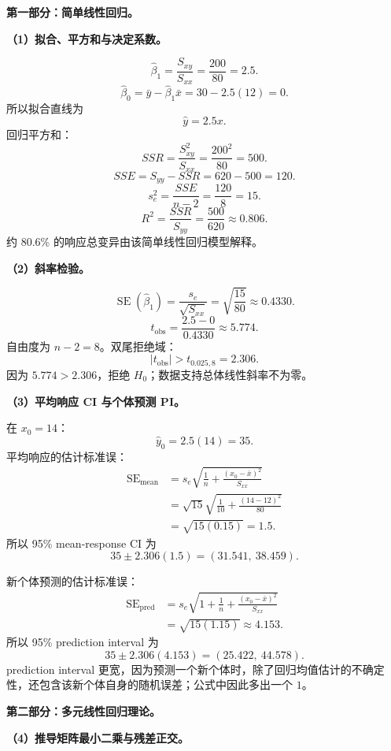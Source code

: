 \documentclass[11pt,a4paper]{article}
\newcommand{\SE}{\operatorname{SE}}
\begin{document}
\begin{solutionbox}
\textbf{第一部分：简单线性回归。}

\textbf{（1）拟合、平方和与决定系数。}

\[
  \hat\beta_1
  =
  \frac{S_{xy}}{S_{xx}}
  =
  \frac{200}{80}
  =
  2.5.
\]
\[
  \hat\beta_0
  =
  \bar y-\hat\beta_1\bar x
  =
  30-2.5(12)
  =
  0.
\]
所以拟合直线为
\[
  \boxed{\hat y=2.5x}.
\]
回归平方和：
\[
  SSR
  =
  \frac{S_{xy}^2}{S_{xx}}
  =
  \frac{200^2}{80}
  =
  500.
\]
\[
  SSE
  =
  S_{yy}-SSR
  =
  620-500
  =
  \boxed{120}.
\]
\[
  s_e^2
  =
  \frac{SSE}{n-2}
  =
  \frac{120}{8}
  =
  \boxed{15}.
\]
\[
  R^2
  =
  \frac{SSR}{S_{yy}}
  =
  \frac{500}{620}
  \approx
  \boxed{0.806}.
\]
约 80.6\% 的响应总变异由该简单线性回归模型解释。

\textbf{（2）斜率检验。}

\[
  \SE(\hat\beta_1)
  =
  \frac{s_e}{\sqrt{S_{xx}}}
  =
  \sqrt{\frac{15}{80}}
  \approx0.4330.
\]
\[
  t_{\mathrm{obs}}
  =
  \frac{2.5-0}{0.4330}
  \approx5.774.
\]
自由度为 $n-2=8$。双尾拒绝域：
\[
  |t_{\mathrm{obs}}|>t_{0.025,8}=2.306.
\]
因为 $5.774>2.306$，拒绝 $H_0$；数据支持总体线性斜率不为零。

\textbf{（3）平均响应 CI 与个体预测 PI。}

在 $x_0=14$：
\[
  \hat y_0
  =
  2.5(14)
  =
  35.
\]
平均响应的估计标准误：
\[
\begin{aligned}
  \SE_{\mathrm{mean}}
  &=
  s_e\sqrt{\frac1n+\frac{(x_0-\bar x)^2}{S_{xx}}}\\
  &=
  \sqrt{15}
  \sqrt{\frac1{10}+\frac{(14-12)^2}{80}}\\
  &=
  \sqrt{15(0.15)}
  =
  1.5.
\end{aligned}
\]
所以 95\% mean-response CI 为
\[
  35\pm2.306(1.5)
  =
  \boxed{(31.541,\ 38.459)}.
\]

新个体预测的估计标准误：
\[
\begin{aligned}
  \SE_{\mathrm{pred}}
  &=
  s_e\sqrt{
    1+\frac1n+\frac{(x_0-\bar x)^2}{S_{xx}}
  }\\
  &=
  \sqrt{15(1.15)}
  \approx4.153.
\end{aligned}
\]
所以 95\% prediction interval 为
\[
  35\pm2.306(4.153)
  =
  \boxed{(25.422,\ 44.578)}.
\]
prediction interval 更宽，因为预测一个新个体时，除了回归均值估计的不确定性，还包含该新个体自身的随机误差；公式中因此多出一个 $1$。

\textbf{第二部分：多元线性回归理论。}

\textbf{（4）推导矩阵最小二乘与残差正交。}


\end{solutionbox}
\end{document}
